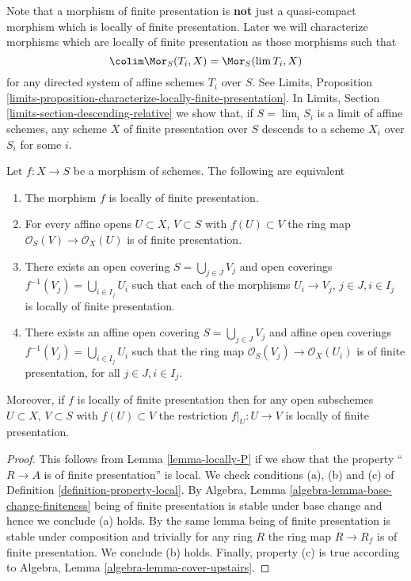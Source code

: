 \noindent
Note that a morphism of finite presentation is {\bf not} just a quasi-compact
morphism which is locally of finite presentation.
Later we will characterize morphisms which are
locally of finite presentation as those morphisms such that
$$
\colim \Mor_S(T_i, X) = \Mor_S(\lim T_i, X)
$$
for any directed system of affine schemes $T_i$ over $S$. See
Limits,
Proposition \ref{limits-proposition-characterize-locally-finite-presentation}.
In Limits, Section \ref{limits-section-descending-relative} we show
that, if $S = \lim_i S_i$ is a limit of affine schemes,
any scheme $X$ of finite presentation over $S$ descends to a scheme
$X_i$ over $S_i$ for some $i$.

\begin{lemma}
\label{lemma-locally-finite-presentation-characterize}
Let $f : X \to S$ be a morphism of schemes.
The following are equivalent
\begin{enumerate}
\item The morphism $f$ is locally of finite presentation.
\item For every affine opens $U \subset X$, $V \subset S$
with $f(U) \subset V$ the ring map
$\mathcal{O}_S(V) \to \mathcal{O}_X(U)$ is of finite presentation.
\item There exists an open covering $S = \bigcup_{j \in J} V_j$
and open coverings $f^{-1}(V_j) = \bigcup_{i \in I_j} U_i$ such
that each of the morphisms $U_i \to V_j$, $j\in J, i\in I_j$
is locally of finite presentation.
\item There exists an affine open covering $S = \bigcup_{j \in J} V_j$
and affine open coverings $f^{-1}(V_j) = \bigcup_{i \in I_j} U_i$ such
that the ring map $\mathcal{O}_S(V_j) \to \mathcal{O}_X(U_i)$ is
of finite presentation, for all $j\in J, i\in I_j$.
\end{enumerate}
Moreover, if $f$ is locally of finite presentation then for
any open subschemes $U \subset X$, $V \subset S$ with $f(U) \subset V$
the restriction $f|_U : U \to V$ is locally of finite presentation.
\end{lemma}

\begin{proof}
This follows from Lemma \ref{lemma-locally-P} if we show that
the property ``$R \to A$ is of finite presentation'' is local.
We check conditions (a), (b) and (c) of Definition
\ref{definition-property-local}.
By Algebra, Lemma \ref{algebra-lemma-base-change-finiteness}
being of finite presentation is stable under base change and hence
we conclude (a) holds. By the same lemma being of finite presentation
is stable under composition and trivially for any ring
$R$ the ring map $R \to R_f$ is of finite presentation.
We conclude (b) holds. Finally, property (c) is true
according to Algebra, Lemma \ref{algebra-lemma-cover-upstairs}.
\end{proof}

